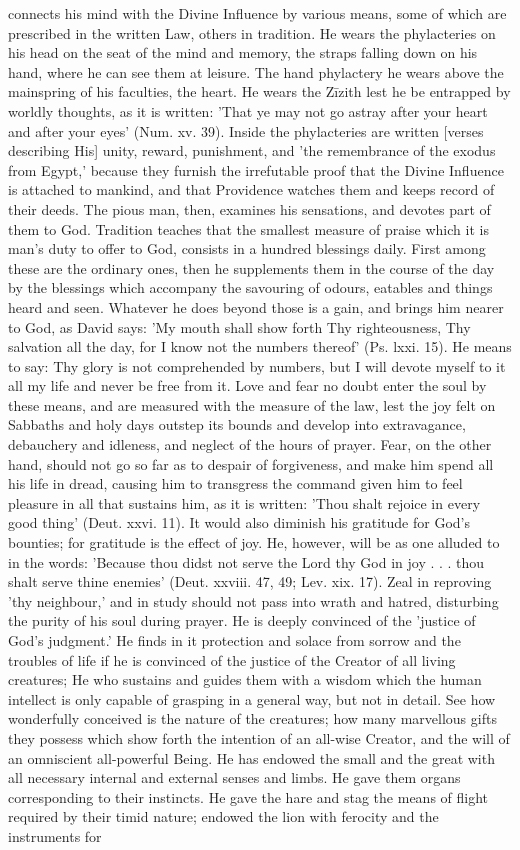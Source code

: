 \documentclass[12pt]{article}
\begin{document}
connects his mind with the Divine Influence by various means, some of which are prescribed in the written Law, others in tradition. He wears the phylacteries on his head on the seat of the mind and memory, the straps falling down on his hand, where he can see them at leisure. The hand phylactery he wears above the mainspring of his faculties, the heart. He wears the Zīzith lest he be entrapped by worldly thoughts, as it is written: 'That ye may not go astray after your heart and after your eyes' (Num. xv. 39). Inside the phylacteries are written [verses describing His] unity, reward, punishment, and 'the remembrance of the exodus from Egypt,' because they furnish the irrefutable proof that the Divine Influence is attached to mankind, and that Providence watches them and keeps record of their deeds. The pious man, then, examines his sensations, and devotes part of them to God. Tradition teaches that the smallest measure of praise which it is man's duty to offer to God, consists in a hundred blessings daily. First among these are the ordinary ones, then he supplements them in the course of the day by the blessings which accompany the savouring of odours, eatables and things heard and seen. Whatever he does beyond those is a gain, and brings him nearer to God, as David says: 'My mouth shall show forth Thy righteousness, Thy salvation all the day, for I know not the numbers thereof' (Ps. lxxi. 15). He means to say: Thy glory is not comprehended by numbers, but I will devote myself to it all my life and never be free from it. Love and fear no doubt enter the soul by these means, and are measured with the measure of the law, lest the joy felt on Sabbaths and holy days outstep its bounds and develop into extravagance, debauchery and idleness, and neglect of the hours of prayer. Fear, on the other hand, should not go so far as to despair of forgiveness, and make him spend all his life in dread, causing him to transgress the command given him to feel pleasure in all that sustains him, as it is written: 'Thou shalt rejoice in every good thing' (Deut. xxvi. 11). It would also diminish his gratitude for God's bounties; for gratitude is the effect of joy. He, however, will be as one alluded to in the words: 'Because thou didst not serve the Lord thy God in joy . . . thou shalt serve thine enemies' (Deut. xxviii. 47, 49; Lev. xix. 17). Zeal in reproving 'thy neighbour,' and in study should not pass into wrath and hatred, disturbing the purity of his soul during prayer. He is deeply convinced of the 'justice of God's judgment.' He finds in it protection and solace from sorrow and the troubles of life if he is convinced of the justice of the Creator of all living creatures; He who sustains and guides them with a wisdom which the human intellect is only capable of grasping in a general way, but not in detail. See how wonderfully conceived is the nature of the creatures; how many marvellous gifts they possess which show forth the intention of an all-wise Creator, and the will of an omniscient all-powerful Being. He has endowed the small and the great with all necessary internal and external senses and limbs. He gave them organs corresponding to their instincts. He gave the hare and stag the means of flight required by their timid nature; endowed the lion with ferocity and the instruments for 
\end{document}
